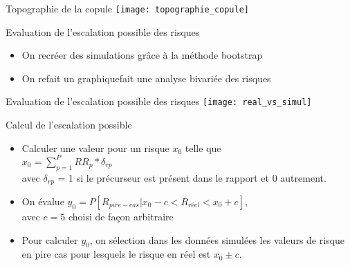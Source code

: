 \begin{frame}
	Topographie de la copule
	\texttt{[image: topographie\_copule]}	
	
\end{frame}


\begin{frame}
	Evaluation de l'escalation possible des risques
	\begin{itemize}
	\item On recréer des simulations grâce à la méthode bootstrap 
	\item On refait un graphiquefait une analyse bivariée des risques
	\end{itemize}
\end{frame}
	

\begin{frame}
	Evaluation de l'escalation possible des risques
	\texttt{[image: real\_vs\_simul]}	
\end{frame}



\begin{frame}
	Calcul de l'escalation possible
	
	\begin{itemize}
		\item Calculer une valeur pour un risque $x_0$ telle que\\
		$x_0 = \sum_{p=1}^{P} RR_p * \delta_{rp}$\\
		avec $\delta_{rp}$ = 1 si le précurseur est présent dans le rapport et 0 autrement.
		\item On évalue $y_0 = P[R_{pire-cas}|x_0 - c < R_{réel}< x_0 + c ]$, \\
		avec $c=5$ choisi de façon arbitraire
		\item Pour calculer $y_0$, on sélection dans les données simulées les valeurs de risque en pire cas pour lesquels le risque en réel est $x_0 \pm c$.
	\end{itemize}
	
\end{frame}



